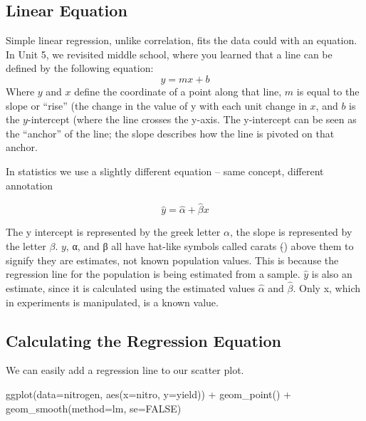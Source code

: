 \documentclass[
]{book}
\newenvironment{Shaded}{\begin{snugshade}}{\end{snugshade}}
\newcommand{\AttributeTok}[1]{\textcolor[rgb]{0.77,0.63,0.00}{#1}}
\newcommand{\ConstantTok}[1]{\textcolor[rgb]{0.00,0.00,0.00}{#1}}
\newcommand{\FunctionTok}[1]{\textcolor[rgb]{0.00,0.00,0.00}{#1}}
\newcommand{\NormalTok}[1]{#1}
\newcommand{\SpecialCharTok}[1]{\textcolor[rgb]{0.00,0.00,0.00}{#1}}
\begin{document}
\hypertarget{linear-equation}{%
\subsection{Linear Equation}\label{linear-equation}}

Simple linear regression, unlike correlation, fits the data could with an equation. In Unit 5, we revisited middle school, where you learned that a line can be defined by the following equation:
\[ y = mx + b \]
Where \(y\) and \(x\) define the coordinate of a point along that line, \(m\) is equal to the slope or ``rise'' (the change in the value of y with each unit change in \(x\), and \(b\) is the \(y\)-intercept (where the line crosses the y-axis. The y-intercept can be seen as the ``anchor'' of the line; the slope describes how the line is pivoted on that anchor.

In statistics we use a slightly different equation -- same concept, different annotation

\[\hat{y} = \hat{\alpha} + \hat{\beta} x\]

The y intercept is represented by the greek letter \(\alpha\), the slope is represented by the letter \(\beta\). \(y\), α, and β all have hat-like symbols called carats (\(\hat{}\)) above them to signify they are estimates, not known population values. This is because the regression line for the population is being estimated from a sample. \(\hat{y}\) is also an estimate, since it is calculated using the estimated values \(\hat{\alpha}\) and \(\hat{\beta}\). Only x, which in experiments is manipulated, is a known value.

\hypertarget{calculating-the-regression-equation}{%
\subsection{Calculating the Regression Equation}\label{calculating-the-regression-equation}}

We can easily add a regression line to our scatter plot.

\begin{Shaded}
\begin{Highlighting}[]
\FunctionTok{ggplot}\NormalTok{(}\AttributeTok{data=}\NormalTok{nitrogen, }\FunctionTok{aes}\NormalTok{(}\AttributeTok{x=}\NormalTok{nitro, }\AttributeTok{y=}\NormalTok{yield)) }\SpecialCharTok{+}
  \FunctionTok{geom\_point}\NormalTok{() }\SpecialCharTok{+}
  \FunctionTok{geom\_smooth}\NormalTok{(}\AttributeTok{method=}\NormalTok{lm, }\AttributeTok{se=}\ConstantTok{FALSE}\NormalTok{)}
\end{Highlighting}
\end{Shaded}
\end{document}
